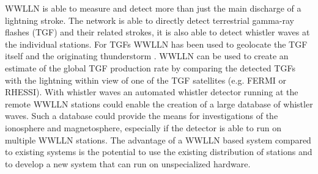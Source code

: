 WWLLN is able to measure and detect more than just the main discharge of a lightning stroke.
The network is able to directly detect terrestrial gamma-ray flashes (TGF) and their related strokes, it is also able to detect whistler waves at the individual stations.
For TGFs WWLLN has been used to geolocate the TGF itself and the originating thunderstorm \citep{Connaughton2010, Connaughton2013}.
WWLLN can be used to create an estimate of the global TGF production rate by comparing the detected TGFs with the lightning within view of one of the TGF satellites (e.g. FERMI or RHESSI).
With whistler waves an automated whistler detector running at the remote WWLLN stations could enable the creation of a large database of whistler waves.
Such a database could provide the means for investigations of the ionosphere and magnetosphere, especially if the detector is able to run on multiple WWLLN stations.
The advantage of a WWLLN based system compared to existing systems is the potential to use the existing distribution of stations and to develop a new system that can run on unspecialized hardware.


